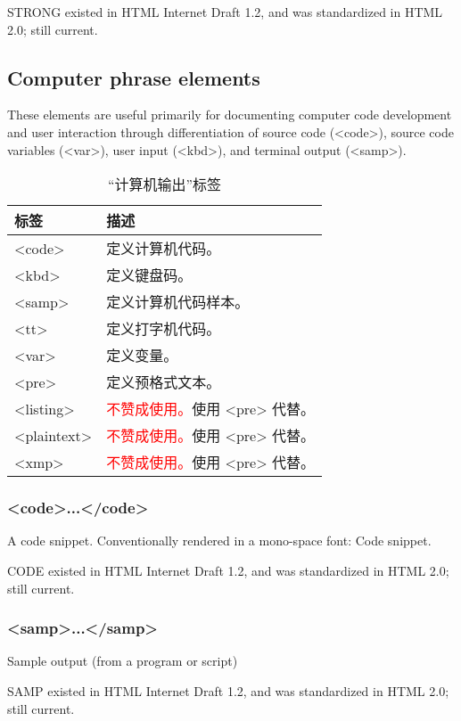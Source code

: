 STRONG existed in HTML Internet Draft 1.2, and was standardized in HTML 2.0; still current.


\subsection{Computer phrase elements}

These elements are useful primarily for documenting computer code development and user interaction through differentiation of source code (<code>), source code variables (<var>), user input (<kbd>), and terminal output (<samp>).

\begin{table}[!h]
\centering
\caption{“计算机输出”标签}
\begin{tabular}{|l|l|}
\hline
标签		&描述						\\
\hline
<code>	&定义计算机代码。			\\
\hline
<kbd>	&定义键盘码。				\\
\hline
<samp>	&定义计算机代码样本。		\\
\hline
<tt>		&定义打字机代码。			\\
\hline
<var>	&定义变量。					\\
\hline
<pre>	&定义预格式文本。			\\
\hline
<listing>	&\textcolor{Red}{不赞成使用。}使用 <pre> 代替。\\
\hline
<plaintext>&\textcolor{Red}{不赞成使用。}使用 <pre> 代替。\\
\hline
<xmp>	&\textcolor{Red}{不赞成使用。}使用 <pre> 代替。\\
\hline
\end{tabular}
\end{table}

\subsubsection{<code>...</code>}

A code snippet. Conventionally rendered in a mono-space font: Code snippet.

CODE existed in HTML Internet Draft 1.2, and was standardized in HTML 2.0; still current.


\subsubsection{<samp>...</samp>}

Sample output (from a program or script)

SAMP existed in HTML Internet Draft 1.2, and was standardized in HTML 2.0; still current.


